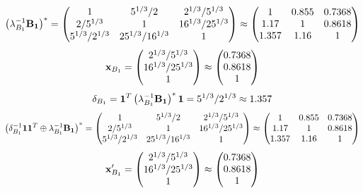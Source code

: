 \documentclass[10pt,a4paper]{article}
\begin{document}
	\[
		\left(\lambda_{B_1}^{-1}\bold{B_1}\right)^* = 
		\begin{pmatrix}
			{1}{} & {{5^ {1 / 3}}} / {{2}} & {{2^ {1 / 3}}} / {{5^ {1 / 3}}} \\
			{{2}} / {{5^ {1 / 3}}} & {1}{} & {{16^ {1 / 3}}} / {{25^ {1 / 3}}} \\
			{{5^ {1 / 3}}} / {{2^ {1 / 3}}} & {{25^ {1 / 3}}} / {{16^ {1 / 3}}} & {1}{} \\
		\end{pmatrix}
		\approx
		\begin{pmatrix}
			1        & 0.855    & 0.7368   \\
			1.17     & 1        & 0.8618   \\
			1.357    & 1.16     & 1        \\
		\end{pmatrix}
	\]
	\[
		\bold{x}_{B_1} = 
		\begin{pmatrix}
			{{2^ {1 / 3}}} / {{5^ {1 / 3}}} \\
			{{16^ {1 / 3}}} / {{25^ {1 / 3}}} \\
			{1}{} \\
		\end{pmatrix}
		\approx
		\begin{pmatrix}
			0.7368   \\
			0.8618   \\
			1        \\
		\end{pmatrix}
	\]
	\[
		\delta_{B_1} = \bold{1}^T \left(\lambda_{B_1}^{-1}\bold{B_1}\right)^* \bold{1} = {{5^ {1 / 3}}} / {{2^ {1 / 3}}}\approx 1.357
	\]
	\[
		\left(\delta_{B_1}^{-1}\bold{11}^T \oplus \lambda_{B_1}^{-1}\bold{B_1}\right)^* = 
		\begin{pmatrix}
			{1}{} & {{5^ {1 / 3}}} / {{2}} & {{2^ {1 / 3}}} / {{5^ {1 / 3}}} \\
			{{2}} / {{5^ {1 / 3}}} & {1}{} & {{16^ {1 / 3}}} / {{25^ {1 / 3}}} \\
			{{5^ {1 / 3}}} / {{2^ {1 / 3}}} & {{25^ {1 / 3}}} / {{16^ {1 / 3}}} & {1}{} \\
		\end{pmatrix}
		\approx
		\begin{pmatrix}
			1        & 0.855    & 0.7368   \\
			1.17     & 1        & 0.8618   \\
			1.357    & 1.16     & 1        \\
		\end{pmatrix}
	\]
	\[
		\bold{x}'_{B_1} = 
		\begin{pmatrix}
			{{2^ {1 / 3}}} / {{5^ {1 / 3}}} \\
			{{16^ {1 / 3}}} / {{25^ {1 / 3}}} \\
			{1}{} \\
		\end{pmatrix}
		\approx
		\begin{pmatrix}
			0.7368   \\
			0.8618   \\
			1        \\
		\end{pmatrix}
	\]
\end{document}
